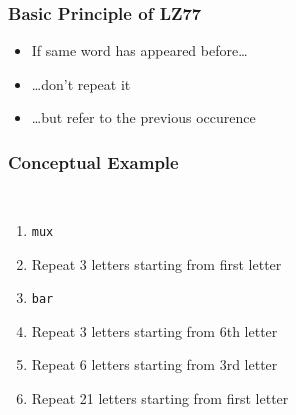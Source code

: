 \documentclass{../ucll-slides}
\begin{document}
\begin{frame}
  \frametitle{Basic Principle of LZ77}
  \begin{itemize}
    \item If same word has appeared before\dots
    \item \dots don't repeat it
    \item \dots but refer to the previous occurence
  \end{itemize}
\end{frame}

{
  \newcommand{\chunk}[3]{
    \draw[|-|] ($ (#1.south west) + (0,-0.1) $) -- ($ (#1.south east) + (0,-0.1) $);
    \draw[|->] ($ (#2.south west) + (0,-0.1) $) -- ($ (#2.south east) + (0,-0.1) $) node[midway,below,font=\tiny] {#3};
    \draw[-latex] ($ (#1.south) + (0,-0.1) $) -- ++(0,-0.5) -| ($ (#2.south west) + (0,-0.2) $);
  }
  \newcommand{\multichunk}[5]{
    \draw[|-|] ($ (#1.south west) + (0,-0.1) $) -- ($ (#2.south east) + (0,-0.1) $);
    \draw[|->] ($ (#3.south west) + (0,-0.1) $) -- ($ (#4.south east) + (0,-0.1) $) node[midway,below,font=\tiny] {#5};
    \draw[-latex] ($ (#1.south) ! 0.5 ! (#2.south) + (0,-0.1) $) -- ++(0,-0.5) -| ($ (#3.south west) + (0,-0.2) $);
  }
  \begin{frame}
    \frametitle{Conceptual Example}
    \begin{center} \tt
    \end{center}
    \vskip5mm
    \begin{enumerate}
      \item<2-> {\tt mux}
      \item<3-> Repeat 3 letters starting from first letter
      \item<4-> {\tt bar}
      \item<5-> Repeat 3 letters starting from 6th letter
      \item<6-> Repeat 6 letters starting from 3rd letter
      \item<7-> Repeat 21 letters starting from first letter
    \end{enumerate}
  \end{frame}
}
\end{document}
